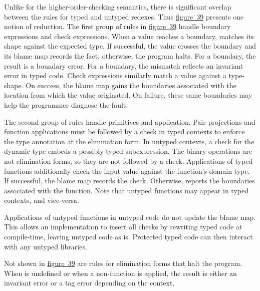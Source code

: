 \documentclass[ twoside,open=right,titlepage,numbers=noenddot,headinclude,%
                footinclude=true,cleardoublepage=empty,abstract=off,
                BCOR=5mm,paper=a4,fontsize=11pt,%
                ngerman,american,%
                parts,pdfspacing]{scrreprt}
\newcommand{\FigureRef}[2]{#1}
\begin{document}
Unlike for the higher{-}order{-}checking semantics, there is significant overlap between the
 \relax{\tname} rules for typed and untyped redexes.
Thus \hyperref[t:x28counter_x28x22figurex22_x22figx3atransientx2dreductionx22x29x29]{figure~\FigureRef{39}{t:x28counter_x28x22figurex22_x22figx3atransientx2dreductionx22x29x29}} presents one notion of reduction.
The first group of rules in \hyperref[t:x28counter_x28x22figurex22_x22figx3atransientx2dreductionx22x29x29]{figure~\FigureRef{39}{t:x28counter_x28x22figurex22_x22figx3atransientx2dreductionx22x29x29}} handle boundary
 expressions and check expressions.
When a value reaches a boundary, \relax{\tname} matches its shape against the
 expected type.
If successful, the value crosses the boundary and its blame map records
 the fact; otherwise, the program halts.
For a \relax{$\sdyn$} boundary, the result is a boundary error.
For a \relax{$\ssta$} boundary, the mismatch reflects an invariant error in typed
 code.
Check expressions similarly match a value against a type{-}shape.
On success, the blame map gains the boundaries associated with
 the location  from which the value originated.
On failure, these same boundaries may help the programmer diagnose the fault.

The second group of rules handle primitives and application.
Pair projections and function applications must be followed by a check
 in typed contexts to enforce the type annotation at the elimination form.
In untyped contexts, a check for the dynamic type embeds a possibly{-}typed subexpression.
The binary operations are not elimination forms, so they are not followed by
 a check.
Applications of typed functions additionally check the input value against
 the function{'}s domain type.
If successful, the blame map records the check.
Otherwise, \relax{\tname} reports the boundaries associated with the function.
Note that untyped functions may appear in typed contexts, and vice{-}versa.

Applications of untyped functions in untyped code do not update the
 blame map.
This allows an implementation to insert all checks by rewriting typed
 code at compile{-}time, leaving untyped code as is.
Protected typed code can then interact with any untyped libraries.

Not shown in \hyperref[t:x28counter_x28x22figurex22_x22figx3atransientx2dreductionx22x29x29]{figure~\FigureRef{39}{t:x28counter_x28x22figurex22_x22figx3atransientx2dreductionx22x29x29}} are rules for elimination
 forms that halt the program.
When \relax{$\sdelta$} is undefined or when a non{-}function is applied, the result
 is either an invariant error or a tag error depending on the context.
\end{document}
